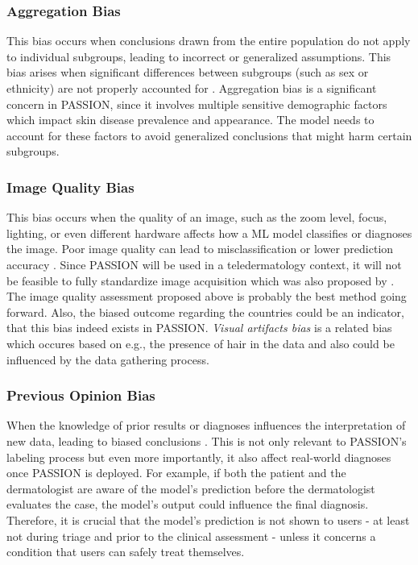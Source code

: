 \documentclass[12pt, a4paper, oneside]{book}   	%
\renewcommand{\paragraph}[1]{%
	\subsubsection*{#1}%
}
\begin{document}
		\paragraph{Aggregation Bias}
		This bias occurs when conclusions drawn from the entire population do not apply to individual subgroups, leading to incorrect or generalized assumptions. This bias arises when significant differences between subgroups (such as sex or ethnicity) are not properly accounted for \autocite{Mehrabi_2021,M144_Suresh_2021}. Aggregation bias is a significant concern in PASSION, since it involves multiple sensitive demographic factors which impact skin disease prevalence and appearance. The model needs to account for these factors to avoid generalized conclusions that might harm certain subgroups.
		
		\paragraph{Image Quality Bias}
		This bias occurs when the quality of an image, such as the zoom level, focus, lighting, or even different hardware affects how a \gls{ML} model classifies or diagnoses the image. Poor image quality can lead to misclassification or lower prediction accuracy \autocite{Young_2020}. Since PASSION will be used in a \gls{teledermatology} context, it will not be feasible to fully standardize image acquisition which was also proposed by \textcite{Young_2020}. The image quality assessment proposed above is probably the best method going forward. Also, the biased outcome regarding the countries could be an indicator, that this bias indeed exists in PASSION. \textit{Visual artifacts bias} is a related bias which occures based on e.g., the presence of hair in the data and also could be influenced by the data gathering process.
		
		\paragraph{Previous Opinion Bias}
		When the knowledge of prior results or diagnoses influences the interpretation of new data, leading to biased conclusions \autocite{Chakraborty_2024}. This is not only relevant to PASSION's labeling process but even more importantly, it also affect real-world diagnoses once PASSION is deployed. For example, if both the patient and the dermatologist are aware of the model's prediction before the dermatologist evaluates the case, the model's output could influence the final diagnosis. Therefore, it is crucial that the model’s prediction is not shown to users - at least not during triage and prior to the clinical assessment - unless it concerns a condition that users can safely treat themselves.
		
\end{document}
